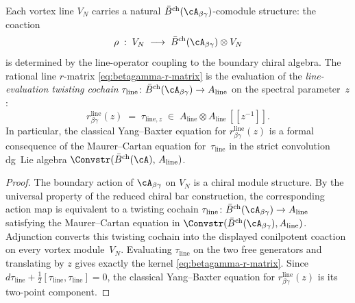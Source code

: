 \begin{proposition}
\label{prop:betagamma-vortex-comodule}
\ClaimStatusProvedHere
{}
Each vortex line $V_N$ carries a natural
$\bar{B}^{\mathrm{ch}}(\cA_{\beta\gamma})$-comodule structure: the
coaction
\[
 \rho \;:\; V_N \;\longrightarrow\;
 \bar{B}^{\mathrm{ch}}(\cA_{\beta\gamma}) \otimes V_N
\]
is determined by the line-operator coupling to the boundary chiral
algebra. The rational line $r$-matrix
\eqref{eq:betagamma-r-matrix} is the evaluation of the
\emph{line-evaluation twisting cochain}
$\tau_{\mathrm{line}} \colon \bar{B}^{\mathrm{ch}}(\cA_{\beta\gamma})
\to A_{\mathrm{line}}$ on the spectral parameter~$z$:
\begin{equation}\label{eq:betagamma-twisting-cochain}
 r^{\mathrm{line}}_{\beta\gamma}(z) \;=\; \tau_{\mathrm{line},z}
 \;\in\;
 A_{\mathrm{line}} \otimes A_{\mathrm{line}}\,[\![z^{-1}]\!].
\end{equation}
In particular, the classical Yang--Baxter equation for
$r^{\mathrm{line}}_{\beta\gamma}(z)$ is a
formal consequence of the Maurer--Cartan equation for~$\tau_{\mathrm{line}}$ in the
strict convolution dg~Lie algebra
$\Convstr(\bar{B}^{\mathrm{ch}}(\cA),\, A_{\mathrm{line}})$.
\end{proposition}

\begin{proof}
The boundary action of $\cA_{\beta\gamma}$ on $V_N$ is a chiral
module structure. By the universal property of the reduced chiral
bar construction, the corresponding action map is equivalent to a
twisting cochain
$\tau_{\mathrm{line}}\colon \bar{B}^{\mathrm{ch}}(\cA_{\beta\gamma})
\to A_{\mathrm{line}}$ satisfying the Maurer--Cartan equation in
$\Convstr(\bar{B}^{\mathrm{ch}}(\cA_{\beta\gamma}),A_{\mathrm{line}})$.
Adjunction converts this twisting cochain into the displayed
conilpotent coaction on every vortex module~$V_N$. Evaluating
$\tau_{\mathrm{line}}$ on the two free generators and translating by
$z$ gives exactly the kernel
\eqref{eq:betagamma-r-matrix}. Since
$d\tau_{\mathrm{line}}+\frac12[\tau_{\mathrm{line}},\tau_{\mathrm{line}}]=0$,
the classical Yang--Baxter equation for
$r^{\mathrm{line}}_{\beta\gamma}(z)$ is its two-point component.
\end{proof}

